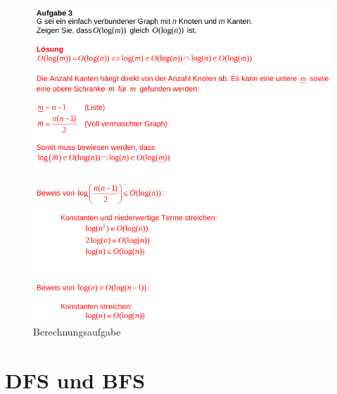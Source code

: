 \begin{figure}[h]
\centering
\includegraphics[width=0.9\linewidth]{images/aufgabe3}
\caption{Berechnungsaufgabe}
\label{fig:berechnungsaufgabe}
\end{figure}

\newpage

\section{DFS und BFS}
